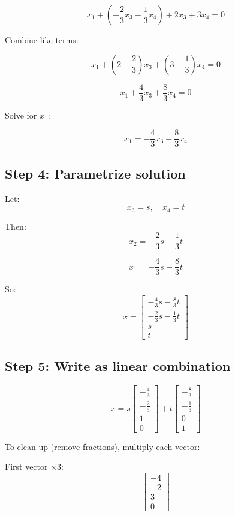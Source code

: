 \documentclass[11pt]{article}
\begin{document}
\[
x_1 + \left(-\frac{2}{3}x_3 - \frac{1}{3}x_4\right) + 2x_3 + 3x_4 = 0
\]

Combine like terms:

\[
x_1 + \left(2 - \frac{2}{3}\right)x_3 + \left(3 - \frac{1}{3}\right)x_4 = 0
\]

\[
x_1 + \frac{4}{3}x_3 + \frac{8}{3}x_4 = 0
\]

Solve for $x_1$:

\[
x_1 = -\frac{4}{3}x_3 - \frac{8}{3}x_4
\]

\hrulefill

\subsection*{Step 4: Parametrize solution}

Let:
\[
x_3 = s,\quad x_4 = t
\]

Then:
\[
x_2 = -\frac{2}{3}s - \frac{1}{3}t
\]

\[
x_1 = -\frac{4}{3}s - \frac{8}{3}t
\]

So:
\[
x =
\begin{bmatrix}
-\frac{4}{3}s - \frac{8}{3}t \\
-\frac{2}{3}s - \frac{1}{3}t \\
s \\
t
\end{bmatrix}
\]

\hrulefill

\subsection*{Step 5: Write as linear combination}

\[
x =
s
\begin{bmatrix}
-\frac{4}{3} \\
-\frac{2}{3} \\
1 \\
0
\end{bmatrix}
+
t
\begin{bmatrix}
-\frac{8}{3} \\
-\frac{1}{3} \\
0 \\
1
\end{bmatrix}
\]

To clean up (remove fractions), multiply each vector:

First vector $\times 3$:
\[
\begin{bmatrix}
-4 \\ -2 \\ 3 \\ 0
\end{bmatrix}
\]
\end{document}
